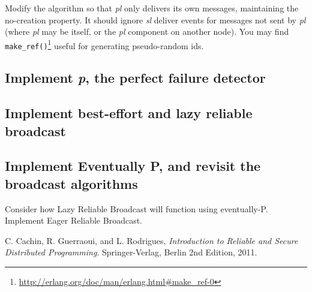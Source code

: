 \documentclass[a4paper]{article}
\begin{document}
Modify the algorithm so that \emph{pl} only delivers its own messages, maintaining
the no-creation property. It should ignore \emph{sl} deliver events for messages not
sent by \emph{pl} (where \emph{pl} may be itself, or the \emph{pl} component
on another node). You may find
\verb!make_ref()!\footnote{\url{http://erlang.org/doc/man/erlang.html\#make_ref-0}}
useful for generating pseudo-random ids.




\subsection{Implement \emph{p}, the perfect failure detector} %
\label{sub:implement_p}



\subsection{Implement best-effort and lazy reliable broadcast} %
\label{sub:implement_best_effort_and_reliable_broadcast}


\subsection{Implement Eventually P, and revisit the broadcast algorithms} %
\label{sub:implement_eventually_p_and_revisit_the_broadcast_algorithms}

Consider how Lazy Reliable Broadcast will function using eventually-P.
Implement Eager Reliable Broadcast.







\begin{thebibliography}{9}

  C. Cachin, R. Guerraoui, and L. Rodrigues,
  \emph{Introduction to Reliable and Secure Distributed Programming}.
  Springer-Verlag, Berlin
  2nd Edition,
  2011.

\end{thebibliography}
\end{document}
